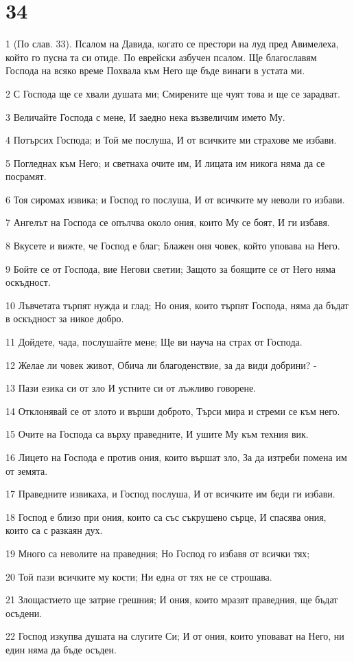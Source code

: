 \chapter{34}

\par 1 (По слав. 33). Псалом на Давида, когато се престори на луд пред Авимелеха, който го пусна та си отиде. По еврейски азбучен псалом. Ще благославям Господа на всяко време Похвала към Него ще бъде винаги в устата ми.
\par 2 С Господа ще се хвали душата ми; Смирените ще чуят това и ще се зарадват.
\par 3 Величайте Господа с мене, И заедно нека възвеличим името Му.
\par 4 Потърсих Господа; и Той ме послуша, И от всичките ми страхове ме избави.
\par 5 Погледнах към Него; и светнаха очите им, И лицата им никога няма да се посрамят.
\par 6 Тоя сиромах извика; и Господ го послуша, И от всичките му неволи го избави.
\par 7 Ангелът на Господа се опълчва около ония, които Му се боят, И ги избавя.
\par 8 Вкусете и вижте, че Господ е благ; Блажен оня човек, който уповава на Него.
\par 9 Бойте се от Господа, вие Негови светии; Защото за боящите се от Него няма оскъдност.
\par 10 Лъвчетата търпят нужда и глад; Но ония, които търпят Господа, няма да бъдат в оскъдност за никое добро.
\par 11 Дойдете, чада, послушайте мене; Ще ви науча на страх от Господа.
\par 12 Желае ли човек живот, Обича ли благоденствие, за да види добрини? -
\par 13 Пази езика си от зло И устните си от лъжливо говорене.
\par 14 Отклонявай се от злото и върши доброто, Търси мира и стреми се към него.
\par 15 Очите на Господа са върху праведните, И ушите Му към техния вик.
\par 16 Лицето на Господа е против ония, които вършат зло, За да изтреби помена им от земята.
\par 17 Праведните извикаха, и Господ послуша, И от всичките им беди ги избави.
\par 18 Господ е близо при ония, които са със съкрушено сърце, И спасява ония, които са с разкаян дух.
\par 19 Много са неволите на праведния; Но Господ го избавя от всички тях;
\par 20 Той пази всичките му кости; Ни една от тях не се строшава.
\par 21 Злощастието ще затрие грешния; И ония, които мразят праведния, ще бъдат осъдени.
\par 22 Господ изкупва душата на слугите Си; И от ония, които уповават на Него, ни един няма да бъде осъден.

